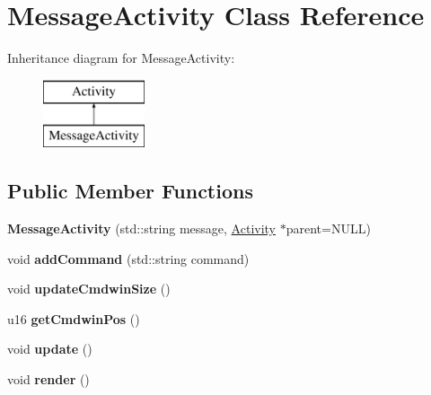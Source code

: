 \hypertarget{classMessageActivity}{\section{Message\-Activity Class Reference}
\label{classMessageActivity}
}
Inheritance diagram for Message\-Activity\-:\begin{figure}[H]
\begin{center}
\leavevmode
\includegraphics[height=2.000000cm]{classMessageActivity}
\end{center}
\end{figure}
\subsection*{Public Member Functions}
\begin{DoxyCompactItemize}
\item 
\hypertarget{classMessageActivity_aa9219936e76d953fb8dbf6337b168d75}{{\bfseries Message\-Activity} (std\-::string message, \hyperlink{classActivity}{Activity} $\ast$parent=N\-U\-L\-L)}\label{classMessageActivity_aa9219936e76d953fb8dbf6337b168d75}

\item 
\hypertarget{classMessageActivity_ab01b1d6eb0e0e53cdd8caaeadaab7468}{void {\bfseries add\-Command} (std\-::string command)}\label{classMessageActivity_ab01b1d6eb0e0e53cdd8caaeadaab7468}

\item 
\hypertarget{classMessageActivity_a657f22456b3902b757a85272b9fdd040}{void {\bfseries update\-Cmdwin\-Size} ()}\label{classMessageActivity_a657f22456b3902b757a85272b9fdd040}

\item 
\hypertarget{classMessageActivity_a1f5c5b3b669f1c22bbe38434e6bf37f3}{u16 {\bfseries get\-Cmdwin\-Pos} ()}\label{classMessageActivity_a1f5c5b3b669f1c22bbe38434e6bf37f3}

\item 
\hypertarget{classMessageActivity_a23c9d5373ce29e95643b3e35473297fb}{void {\bfseries update} ()}\label{classMessageActivity_a23c9d5373ce29e95643b3e35473297fb}

\item 
\hypertarget{classMessageActivity_ad2c57661dd561d6d0f833b08a25c6a76}{void {\bfseries render} ()}\label{classMessageActivity_ad2c57661dd561d6d0f833b08a25c6a76}

\end{DoxyCompactItemize}
